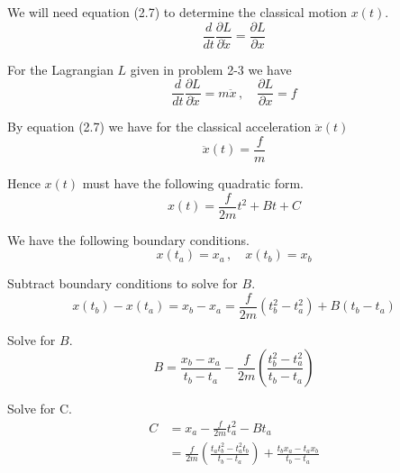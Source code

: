 


\bigskip
We will need equation (2.7) to determine the classical motion $x(t)$.
\begin{equation*}
\frac{d}{dt}\frac{\partial L}{\partial\dot x}=\frac{\partial L}{\partial x}
\tag{2.7}
\end{equation*}

For the Lagrangian $L$ given in problem 2-3 we have
\begin{equation*}
\frac{d}{dt}\frac{\partial L}{\partial\dot x}=m\ddot x\,, %
\quad
\frac{\partial L}{\partial x}=f
\end{equation*}

By equation (2.7) we have for the classical acceleration $\ddot x(t)$
\begin{equation*}
\ddot x(t)=\frac{f}{m}
\end{equation*}

Hence $x(t)$ must have the following quadratic form.
\begin{equation*}
x(t)=\frac{f}{2m}t^2+Bt+C
\tag{1}
\end{equation*}

We have the following boundary conditions.
\begin{equation*}
x(t_a)=x_a\,, %
\quad
x(t_b)=x_b
\end{equation*}

Subtract boundary conditions to solve for $B$.
\begin{equation*}
x(t_b)-x(t_a)
=x_b-x_a
=\frac{f}{2m}\left(t_b^2-t_a^2\right)+B(t_b-t_a)
\end{equation*}

Solve for $B$.
\begin{equation*}
B=\frac{x_b-x_a}{t_b-t_a}-\frac{f}{2m}\left(\frac{t_b^2-t_a^2}{t_b-t_a}\right)
\tag{2}
\end{equation*}

Solve for C.
\begin{align*}
C&=x_a-\frac{f}{2m}t_a^2-Bt_a
\\[1ex]
&=\frac{f}{2m}\left(\frac{t_a t_b^2 - t_a^2 t_b}{t_b - t_a}\right) + \frac{t_b x_a - t_a x_b}{t_b - t_a}
\tag{3}
\end{align*}

